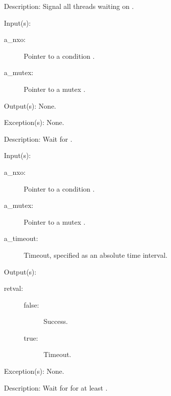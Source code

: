 \begin{capi}
\begin{capilist}
	\item[Description: ]
		Signal all threads waiting on .
	\end{capilist}
\label{nxo_condition_wait}
	\begin{capilist}
	\item[Input(s): ]
		\begin{description}\item[]
		\item[a\_nxo: ]
			Pointer to a condition .
		\item[a\_mutex: ]
			Pointer to a mutex .
		\end{description}
	\item[Output(s): ] None.
	\item[Exception(s): ] None.
	\item[Description: ]
		Wait for .
	\end{capilist}
\label{nxo_condition_timedwait}
	\begin{capilist}
	\item[Input(s): ]
		\begin{description}\item[]
		\item[a\_nxo: ]
			Pointer to a condition \classname{nxo}.
		\item[a\_mutex: ]
			Pointer to a mutex \classname{nxo}.
		\item[a\_timeout: ]
			Timeout, specified as an absolute time interval.
		\end{description}
	\item[Output(s): ]
		\begin{description}\item[]
		\item[retval: ]
			\begin{description}\item[]
			\item[false: ] Success.
			\item[true: ] Timeout.
			\end{description}
		\end{description}
	\item[Exception(s): ] None.
	\item[Description: ]
		Wait for  for at least \cvar{a\_timeout}.
	\end{capilist}
\end{capi}

